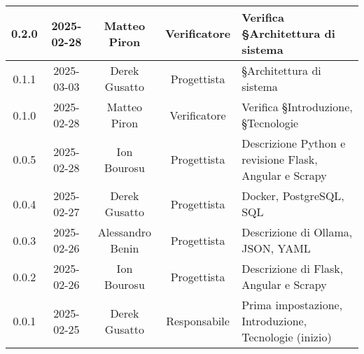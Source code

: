 \begin{longtable}{|c|c|c|c|p{4cm}|}
        \hline
        0.2.0 & 2025-02-28 & Matteo Piron & Verificatore & Verifica §Architettura di sistema \\
        \hline
        0.1.1 & 2025-03-03 & Derek Gusatto & Progettista & §Architettura di sistema \\
        \hline
        0.1.0 & 2025-02-28 & Matteo Piron & Verificatore & Verifica §Introduzione, §Tecnologie \\
        \hline
        0.0.5 & 2025-02-28 & Ion Bourosu & Progettista & Descrizione Python e revisione Flask, Angular e Scrapy \\
        \hline
        0.0.4 & 2025-02-27 & Derek Gusatto & Progettista & Docker, PostgreSQL, SQL \\
        \hline
        0.0.3 & 2025-02-26 & Alessandro Benin & Progettista & Descrizione di Ollama, JSON, YAML \\
        \hline
        0.0.2 & 2025-02-26 & Ion Bourosu & Progettista & Descrizione di Flask, Angular e Scrapy \\
        \hline
        0.0.1 & 2025-02-25 & Derek Gusatto & Responsabile & Prima impostazione, Introduzione, Tecnologie (inizio) \\
        \hline
\end{longtable}
